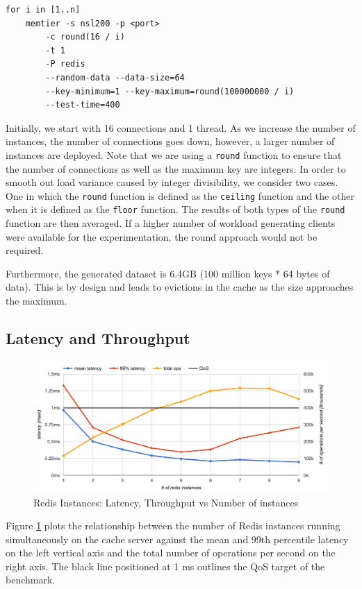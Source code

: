 \begin{lstlisting}
for i in [1..n]
    memtier -s nsl200 -p <port>
        -c round(16 / i)
        -t 1
        -P redis
        --random-data --data-size=64
        --key-minimum=1 --key-maximum=round(100000000 / i)
        --test-time=400
\end{lstlisting}

Initially, we start with 16 connections and 1 thread. As we increase the number of instances, the number of connections goes down, however, a larger number of instances are deployed. Note that we are using a \texttt{round} function to ensure that the number of connections as well as the maximum key are integers. In order to smooth out load variance caused by integer divisibility, we consider two cases. One in which the \texttt{round} function is defined as the \texttt{ceiling} function and the other when it is defined as the \texttt{floor} function. The results of both types of the \texttt{round} function are then averaged. If a higher number of workload generating clients were available for the experimentation, the round approach would not be required.

Furthermore, the generated dataset is 6.4GB (100 million keys * 64 bytes of data). This is by design and leads to evictions in the cache as the size approaches the maximum.


\subsection{Latency and Throughput}

\begin{figure}[h]
    \includegraphics[width=\textwidth]{./res/6_instances_latency_ops.png}
    \caption{Redis Instances: Latency, Throughput vs Number of instances}
    \label{fig:redis-instances-latency-ops}
\end{figure}

Figure \ref{fig:redis-instances-latency-ops} plots the relationship between the number of Redis instances running simultaneously on the cache server against the mean and 99th percentile latency on the left vertical axis and the total number of operations per second on the right axis. The black line positioned at 1 ms outlines the QoS target of the benchmark.

